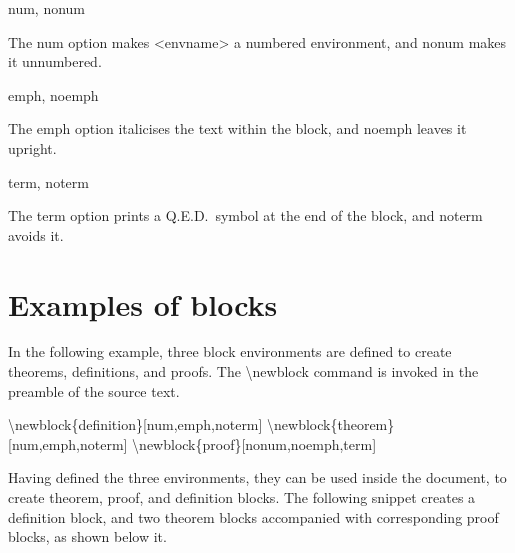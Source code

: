 \documentclass[twoside,openany]{thesis}
\begin{document}
\begin{listing}

\item   {\ttfamily num, nonum}

        The {\ttfamily num} option makes {\ttfamily<envname>} a numbered environment, and {\ttfamily nonum} makes it unnumbered.

\item   {\ttfamily emph, noemph}

        The {\ttfamily emph} option italicises the text within the block, and {\ttfamily noemph} leaves it upright.

\item   {\ttfamily term, noterm}

        The {\ttfamily term} option prints a Q.E.D.\ symbol at the end of the block, and {\ttfamily noterm} avoids it.

\end{listing}

\section{Examples of blocks}\label{sec:Examples of blocks}

In the following example, three block environments are defined to create theorems, definitions, and proofs.
The {\ttfamily\textbackslash newblock} command is invoked in the preamble of the source text.

{\ttfamily
    \textbackslash newblock\{definition\}[num,emph,noterm]\linebreak
    \textbackslash newblock\{theorem\}[num,emph,noterm]\linebreak
    \textbackslash newblock\{proof\}[nonum,noemph,term]
}

Having defined the three environments, they can be used inside the document, to create theorem, proof, and definition blocks.
The following snippet creates a definition block, and two theorem blocks accompanied with corresponding proof blocks, as shown below it.
\end{document}
